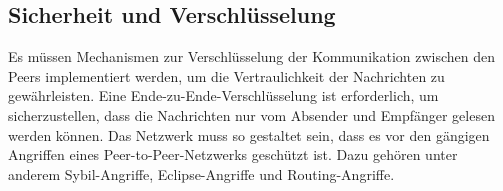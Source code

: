 \subsection{Sicherheit und Verschlüsselung}


Es müssen Mechanismen zur Verschlüsselung der Kommunikation zwischen den Peers implementiert werden, um die Vertraulichkeit der Nachrichten zu gewährleisten. Eine Ende-zu-Ende-Verschlüsselung ist erforderlich, um sicherzustellen, dass die Nachrichten nur vom Absender und Empfänger gelesen werden können.
Das Netzwerk muss so gestaltet sein, dass es vor den gängigen Angriffen eines Peer-to-Peer-Netzwerks geschützt ist. Dazu gehören unter anderem Sybil-Angriffe, Eclipse-Angriffe und Routing-Angriffe. 